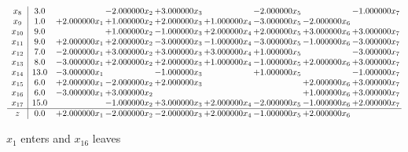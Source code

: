 \documentclass[10pt]{article}
\begin{document}
\[\begin{array}{c| c c@{\hskip 2pt} c@{\hskip 2pt} c@{\hskip 2pt} c@{\hskip 2pt} c@{\hskip 2pt} c@{\hskip 2pt} c@{\hskip 2pt} }
 x_{8}   &  3.0  &   & -2.000000 x_{2} & + 3.000000 x_{3} &   & -2.000000 x_{5} &   & -1.000000 x_{7}\\
 x_{9}   &  1.0 & + 2.000000 x_{1} & + 1.000000 x_{2} & + 2.000000 x_{3} & + 1.000000 x_{4} & -3.000000 x_{5} & -2.000000 x_{6} &   \\
 x_{10}   &  9.0  &   & + 1.000000 x_{2} & -1.000000 x_{3} & + 2.000000 x_{4} & + 2.000000 x_{5} & + 3.000000 x_{6} & + 3.000000 x_{7}\\
 x_{11}   &  9.0 & + 2.000000 x_{1} & + 2.000000 x_{2} & -3.000000 x_{3} & -1.000000 x_{4} & -3.000000 x_{5} & -1.000000 x_{6} & -3.000000 x_{7}\\
 x_{12}   &  7.0 & -2.000000 x_{1} & + 3.000000 x_{2} & + 3.000000 x_{3} & + 3.000000 x_{4} & + 1.000000 x_{5} &   & -3.000000 x_{7}\\
 x_{13}   &  8.0 & -3.000000 x_{1} & + 2.000000 x_{2} & + 2.000000 x_{3} & + 1.000000 x_{4} & -1.000000 x_{5} & + 2.000000 x_{6} & + 3.000000 x_{7}\\
 x_{14}   &  13.0 & -3.000000 x_{1} &   & -1.000000 x_{3} &   & + 1.000000 x_{5} &   & -1.000000 x_{7}\\
 x_{15}   &  6.0 & + 2.000000 x_{1} & -2.000000 x_{2} & + 2.000000 x_{3} &    &   & + 2.000000 x_{6} & + 3.000000 x_{7}\\
 x_{16}   &  6.0 & -3.000000 x_{1} & + 3.000000 x_{2} &    &    &   & + 1.000000 x_{6} & + 3.000000 x_{7}\\
 x_{17}   &  15.0  &   & -1.000000 x_{2} & + 3.000000 x_{3} & + 2.000000 x_{4} & -2.000000 x_{5} & -1.000000 x_{6} & + 2.000000 x_{7}\\
\hline
z    &  0.0 & + 2.000000 x_{1} & -2.000000 x_{2} & -2.000000 x_{3} & + 2.000000 x_{4} & -1.000000 x_{5} & + 2.000000 x_{6} &   \\
\end{array}\]


 $ x_{1} $ enters and $ x_{16} $ leaves 
\end{document}
